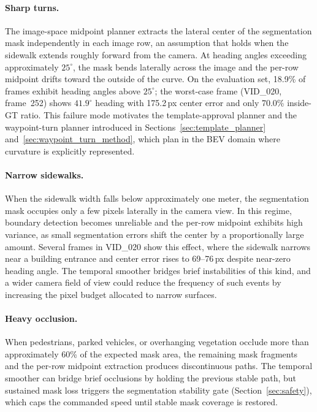 \documentclass[12pt,letterpaper,oneside]{report}
\begin{document}
\paragraph{Sharp turns.}
The image-space midpoint planner extracts the lateral center of the segmentation mask independently in each image row, an assumption that holds when the sidewalk extends roughly forward from the camera.  At heading angles exceeding approximately $25^\circ$, the mask bends laterally across the image and the per-row midpoint drifts toward the outside of the curve.  On the evaluation set, 18.9\% of frames exhibit heading angles above $25^\circ$; the worst-case frame (VID\_020, frame~252) shows $41.9^\circ$ heading with 175.2\,px center error and only 70.0\% inside-GT ratio.  This failure mode motivates the template-approval planner and the waypoint-turn planner introduced in Sections~\ref{sec:template_planner} and~\ref{sec:waypoint_turn_method}, which plan in the BEV domain where curvature is explicitly represented.

\paragraph{Narrow sidewalks.}
When the sidewalk width falls below approximately one meter, the segmentation mask occupies only a few pixels laterally in the camera view.  In this regime, boundary detection becomes unreliable and the per-row midpoint exhibits high variance, as small segmentation errors shift the center by a proportionally large amount.  Several frames in VID\_020 show this effect, where the sidewalk narrows near a building entrance and center error rises to 69--76\,px despite near-zero heading angle.  The temporal smoother bridges brief instabilities of this kind, and a wider camera field of view could reduce the frequency of such events by increasing the pixel budget allocated to narrow surfaces.

\paragraph{Heavy occlusion.}
When pedestrians, parked vehicles, or overhanging vegetation occlude more than approximately 60\% of the expected mask area, the remaining mask fragments and the per-row midpoint extraction produces discontinuous paths.  The temporal smoother can bridge brief occlusions by holding the previous stable path, but sustained mask loss triggers the segmentation stability gate (Section~\ref{sec:safety}), which caps the commanded speed until stable mask coverage is restored.
\end{document}
